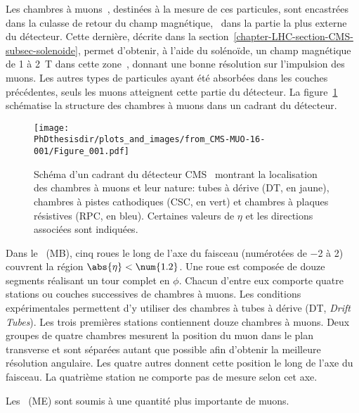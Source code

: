 \par Les chambres à muons~\cite{cms_paper,CERN-LHCC-97-032,CMS-MUO-11-001,CMS-MUO-16-001}, destinées à la mesure de ces particules, sont encastrées dans la culasse de retour du champ magnétique, \ie\ dans la partie la plus externe du détecteur.
Cette dernière, décrite dans la section~\ref{chapter-LHC-section-CMS-subsec-solenoide}, permet d'obtenir, à l'aide du solénoïde, un champ magnétique de \num{1} à \SI{2}{\tesla} dans cette zone~\cite{CMS_magnetic_field}, donnant une bonne résolution sur l'impulsion des muons.
Les autres types de particules ayant été absorbées dans les couches précédentes, seuls les muons atteignent cette partie du détecteur.
La figure~\ref{fig-chapter-LHC-section-CMS-subsec-muons-CMS-MUO-16-001-Figure_001} schématise la structure des chambres à muons dans un cadrant du détecteur.
\begin{figure}[t]
\centering
\texttt{[image: \\PhDthesisdir/plots\_and\_images/from\_CMS-MUO-16-001/Figure\_001.pdf]}
\caption[Schéma des chambres à muons de CMS.]{Schéma d'un cadrant du détecteur CMS~\cite{CMS-MUO-16-001} montrant la localisation des chambres à muons et leur nature: tubes à dérive (DT, en jaune), chambres à pistes cathodiques (CSC, en vert) et chambres à plaques résistives (RPC, en bleu). Certaines valeurs de $\eta$ et les directions associées sont indiquées.}
\label{fig-chapter-LHC-section-CMS-subsec-muons-CMS-MUO-16-001-Figure_001}
\end{figure}
\par Dans le \CMSbarrel\ (MB), cinq roues le long de l'axe du faisceau (numérotées de \num{-2} à \num{2}) couvrent la région $\abs{\eta}<\num{1.2}$.
Une roue est composée de douze segments réalisant un tour complet en $\phi$.
Chacun d'entre eux comporte quatre stations ou couches successives de chambres à muons.
Les conditions expérimentales permettent d'y utiliser des chambres à tubes à dérive (DT, \emph{Drift Tubes}).
Les trois premières stations contiennent douze chambres à muons.
Deux groupes de quatre chambres mesurent la position du muon dans le plan transverse et sont séparées autant que possible afin d'obtenir la meilleure résolution angulaire.
Les quatre autres donnent cette position le long de l'axe du faisceau.
La quatrième station ne comporte pas de mesure selon cet axe.
\par Les \CMSendcaps\ (ME) sont soumis à une quantité plus importante de muons.
